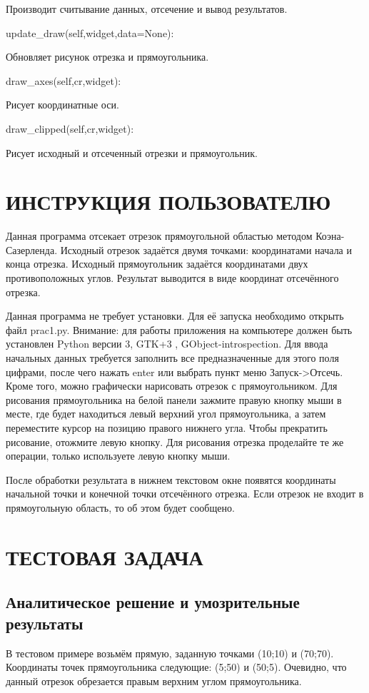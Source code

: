 {Производит считывание данных, отсечение и вывод результатов.

\item update\_draw(self,widget,data=None):

Обновляет рисунок отрезка и прямоугольника.

\item draw\_axes(self,cr,widget):

Рисует координатные оси.

\item draw\_clipped(self,cr,widget):

Рисует исходный и отсеченный отрезки  и прямоугольник.

}
\section{ИНСТРУКЦИЯ ПОЛЬЗОВАТЕЛЮ}
Данная программа отсекает отрезок прямоугольной областью методом Коэна-Сазерленда. Исходный отрезок задаётся двумя точками: координатами начала и конца отрезка. Исходный прямоугольник задаётся координатами двух противоположных углов. Результат выводится в виде координат отсечённого отрезка.

Данная программа не требует установки. Для её запуска необходимо открыть файл prac1.py. Внимание: для работы приложения на компьютере должен быть установлен Python версии 3, GTK+3 , GObject-introspection. Для ввода начальных данных требуется заполнить все предназначенные для этого поля цифрами, после чего нажать enter или выбрать пункт меню Запуск->Отсечь. Кроме того, можно графически нарисовать отрезок с прямоугольником. Для рисования прямоугольника на белой панели зажмите правую кнопку мыши в месте, где будет находиться левый верхний угол прямоугольника, а затем переместите курсор на позицию правого нижнего угла. Чтобы прекратить рисование, отожмите левую кнопку. Для рисования отрезка проделайте те же операции, только используете левую кнопку мыши. 

После обработки результата в нижнем текстовом окне появятся координаты начальной точки и конечной точки отсечённого отрезка. Если отрезок не входит в прямоугольную область, то об этом будет сообщено.

\section{ТЕСТОВАЯ ЗАДАЧА}
\subsection{Аналитическое решение и умозрительные результаты}
В тестовом примере возьмём прямую, заданную точками (10;10) и (70;70). Координаты точек прямоугольника следующие: (5;50) и (50;5). Очевидно, что данный отрезок обрезается правым верхним углом прямоугольника. 

